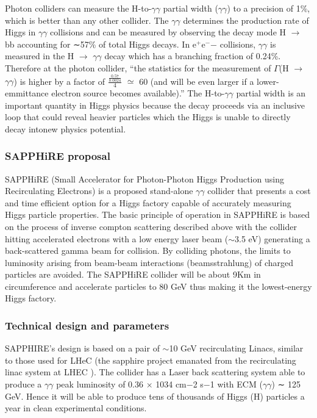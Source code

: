 Photon colliders can measure the H-to-$\gamma\gamma$ partial width ($\gamma\gamma$) to a precision of 1\%\cite{Chou:Higgs}, which is better than any other collider. The $\gamma\gamma$ determines the production rate of Higgs in $\gamma\gamma$ collisions and can be measured by observing the decay mode H $\rightarrow$ bb accounting for ∼57\% of total Higgs decays. In e$^{+}$e$^{-}$− collisions, $\gamma\gamma$ is measured in the H $\rightarrow$ $\gamma\gamma$ decay which has a branching fraction of 0.24\%. Therefore at the photon collider, ``the statistics for the measurement of $\Gamma$(H $\rightarrow$ $\gamma\gamma$) is higher by a factor of $\frac{\frac{0.57}{0.0024}}{4}$ $\simeq$ 60 (and will be even larger if a lower-emmittance electron source becomes available).''\cite{Telnov:Photons} The H-to-$\gamma\gamma$ partial width is an important quantity in Higgs physics because the decay proceeds via an inclusive loop that could reveal heavier particles which the Higgs is unable to directly decay into\textemdash new physics potential.

\subsubsection{SAPPHiRE proposal}
SAPPHiRE (Small Accelerator for Photon-Photon Higgs Production using Recirculating Electrons) is a proposed stand-alone $\gamma\gamma$ collider that presents a cost and time efficient option for a Higgs factory capable of accurately measuring Higgs particle properties. The basic principle of operation in SAPPHiRE is based on the process of inverse compton scattering described above with the collider hitting accelerated electrons with a low energy laser beam ($\sim$3.5 eV) generating a back-scattered gamma beam for collision. By colliding photons, the limits to luminosity arising from beam-beam interactions (beamsstrahlung) of charged particles are avoided\cite{Zimmermann:SAPPHiRE}. The SAPPHiRE collider will be about 9Km in circumference and accelerate particles to 80 GeV thus making it the lowest-energy Higgs factory\cite{Bogacz:SAPPHiRE}.

\subsubsection{Technical design and parameters}                                                                                                            SAPPHIRE's design is based on a pair of $\sim$10 GeV recirculating Linacs, similar to those used for LHeC (the sapphire project emanated from the recirculating linac system at LHEC ). The collider has a Laser back scattering system able to produce a $\gamma\gamma$ peak luminosity of 0.36 × 1034 cm−2 s−1 with ECM ($\gamma\gamma$) ∼ 125 GeV. Hence it will be able to produce tens of thousands of Higgs (H) particles a year in clean experimental conditions\cite{Bogacz:SAPPHiRE}.

